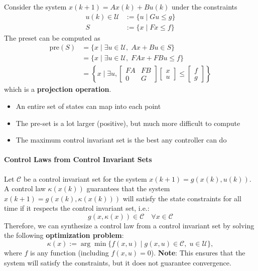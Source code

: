 Consider the system $x(k + 1) = A x(k) + B u(k)$ under the constraints
\begin{align*}
    u(k) \in \mathcal{U} & := \{u \mid G u \leq g \} \\
    S                    & := \{x \mid F x \leq f \}
\end{align*}
The preset can be computed as
\begin{align*}
    \text{pre}(S) & = \{x \mid \exists u \in \mathcal{U}, \; Ax + Bu \in S \}                                                                                                            \\
                  & = \{x \mid \exists u \in \mathcal{U}, \; F A x + F B u \leq f \}                                                                                                     \\
                  & = \left\{ x \mid \exists u, \begin{bmatrix} F A & F B \\ 0 & G \end{bmatrix} \begin{bmatrix} x \\ u \end{bmatrix} \leq \begin{bmatrix} f \\ g \end{bmatrix} \right\}
\end{align*}
which is a \textbf{projection operation}.

\newpar{}

\begin{itemize}
    \item An entire set of states can map into each point
    \item The pre-set is a lot larger (positive), but much more difficult to compute
    \item The maximum control invariant set is the best any controller can do
\end{itemize}

\paragraph{Control Laws from Control Invariant Sets}

Let $\mathcal{C}$ be a control invariant set for the system $x(k + 1) = g(x(k), u(k))$.
\newpar{}
A control law $\kappa(x(k))$ guarantees that the system $x(k + 1) = g(x(k), \kappa(x(k)))$ will satisfy the state constraints for all time if it respects the control invariant set, i.e.:
\begin{equation*}
    g(x, \kappa(x)) \in \mathcal{C} \quad \forall x \in \mathcal{C}
\end{equation*}
Therefore, we can synthesize a control law from a control invariant set by solving the following \textbf{optimization problem}:
\begin{equation*}
    \kappa(x) := \arg\min \{ f(x, u) \mid g(x, u) \in \mathcal{C},\; u \in \mathcal{U} \},
\end{equation*}
where $f$ is any function (including $f(x, u) = 0$).
\newpar{}
\textbf{Note}: This ensures that the system will satisfy the constraints, but it does not guarantee convergence.

